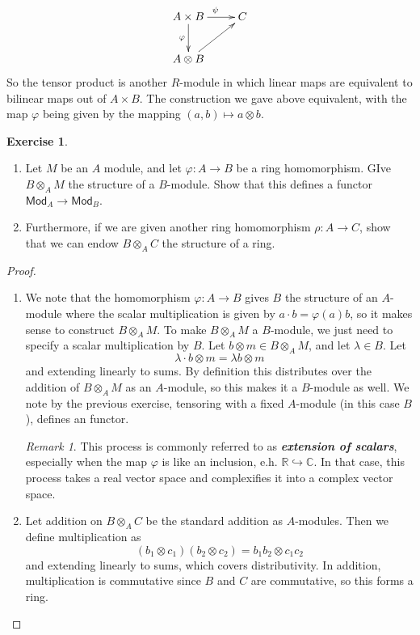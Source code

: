 \documentclass[psamsfonts]{amsart}
\theoremstyle{definition}
\newtheorem{exer}[thm]{Exercise}
\theoremstyle{remark}
\newtheorem*{rem*}{Remark}
\newcommand{\R}{\mathbb{R}}
\newcommand{\ib}[1]{\textbf{\textit{#1}}}
\newcommand{\C}{\mathbb{C}}
\newcommand{\enumbreak}{\ \\ \vspace{-\baselineskip}}
\begin{document}
$$\xymatrix{
A\times B \ar[r]^\psi \ar[d]_{\varphi} & C \\
A \otimes B \ar[ur]
}$$
So the tensor product is another $R$-module in which linear maps are equivalent to bilinear maps out of $A \times B$. The construction we gave above equivalent, with the map $\varphi$ being given by the mapping $(a,b) \mapsto a \otimes b$.
%
\begin{exer}\enumbreak
\begin{enumerate}
\item Let $M$ be an $A$ module, and let $\varphi : A \to B$ be a ring homomorphism. GIve $B \otimes_A M$ the structure of a $B$-module. Show that this defines a functor $\mathsf{Mod}_A \to \mathsf{Mod}_B$.
\item Furthermore, if we are given another ring homomorphism $\rho : A \to C$, show that we can endow $B \otimes_A C$ the structure of a ring.
\end{enumerate}
\end{exer}
%
\begin{proof}\enumbreak
\begin{enumerate}
\item We note that the homomorphism $\varphi: A \to B$ gives $B$ the structure of an $A$-module where the scalar multiplication is given by $a \cdot b = \varphi(a)b$, so it makes sense to construct $B \otimes_A M$. To make $B \otimes_A M$ a $B$-module, we just need to specify a scalar multiplication by $B$. Let $b \otimes m \in B \otimes_A M$, and let $\lambda \in B$. Let
$$\lambda \cdot b \otimes m = \lambda b \otimes m$$
and extending linearly to sums. By definition this distributes over the addition of $B \otimes_A M$ as an $A$-module, so this makes it a $B$-module as well. We note by the previous exercise, tensoring with a fixed $A$-module (in this case $B$), defines an functor.
\begin{rem*}
This process is commonly referred to as \ib{extension of scalars}, especially when the map $\varphi$ is like an inclusion, e.h. $\R \hookrightarrow \C$. In that case, this process takes a real vector space and complexifies it into a complex vector space.
\end{rem*}
\item Let addition on $B \otimes_A C$ be the standard addition as $A$-modules. Then we define multiplication as
$$(b_1\otimes c_1)(b_2 \otimes c_2) = b_1b_2 \otimes  c_1c_2$$
and extending linearly to sums, which covers distributivity. In addition, multiplication is commutative since $B$ and $C$ are commutative, so this forms a ring.
\end{enumerate}
\end{proof}
\end{document}
